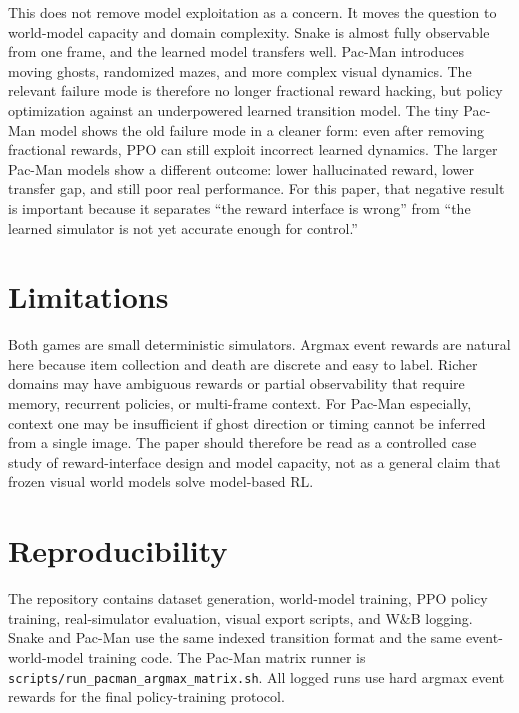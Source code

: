 \documentclass[11pt]{article}
\begin{document}
This does not remove model exploitation as a concern.
It moves the question to world-model capacity and domain complexity.
Snake is almost fully observable from one frame, and the learned model transfers well.
Pac-Man introduces moving ghosts, randomized mazes, and more complex visual dynamics.
The relevant failure mode is therefore no longer fractional reward hacking, but policy optimization against an underpowered learned transition model.
The tiny Pac-Man model shows the old failure mode in a cleaner form: even after removing fractional rewards, PPO can still exploit incorrect learned dynamics.
The larger Pac-Man models show a different outcome: lower hallucinated reward, lower transfer gap, and still poor real performance.
For this paper, that negative result is important because it separates ``the reward interface is wrong'' from ``the learned simulator is not yet accurate enough for control.''

\section{Limitations}
Both games are small deterministic simulators.
Argmax event rewards are natural here because item collection and death are discrete and easy to label.
Richer domains may have ambiguous rewards or partial observability that require memory, recurrent policies, or multi-frame context.
For Pac-Man especially, context one may be insufficient if ghost direction or timing cannot be inferred from a single image.
The paper should therefore be read as a controlled case study of reward-interface design and model capacity, not as a general claim that frozen visual world models solve model-based RL.

\section{Reproducibility}
The repository contains dataset generation, world-model training, PPO policy training, real-simulator evaluation, visual export scripts, and W\&B logging.
Snake and Pac-Man use the same indexed transition format and the same event-world-model training code.
The Pac-Man matrix runner is \texttt{scripts/run\_pacman\_argmax\_matrix.sh}.
All logged runs use hard argmax event rewards for the final policy-training protocol.



\end{document}
